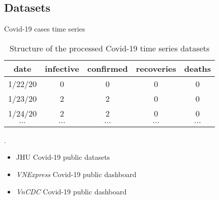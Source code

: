 \subsection{Datasets}

\begin{frame}{Covid-19 cases time series}
    \begin{table}[h]
    \centering
    \begin{tabular}{| c | c | c | c | c |}
        date & infective & confirmed & recoveries & deaths \\
        \hline\hline
        1/22/20 & 0 & 0 & 0 & 0 \\
        \hline
        1/23/20 & 2 & 2 & 0 & 0 \\
        \hline
        1/24/20 & 2 & 2 & 0 & 0 \\
        \hline
        $\cdots$ & $\cdots$ & $\cdots$ & $\cdots$ & $\cdots$ \\
    \end{tabular}
    \caption{Structure of the processed Covid-19 time series datasets}.
    \label{tab:country-covid-timeseries}
    \end{table}

    \begin{itemize}
        \item \gls{JHU} Covid-19 public datasets
        \item \textit{VNExpress} Covid-19 public dashboard
        \item \textit{VnCDC} Covid-19 public dashboard
    \end{itemize}
\end{frame}

